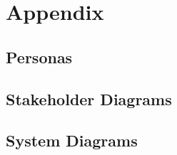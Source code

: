 \documentclass[a4wide, 11pt]{article}
\begin{document}
\section{Appendix}

\subsection{Personas}

\subsection{Stakeholder Diagrams}

\subsection{System Diagrams}
\end{document}
